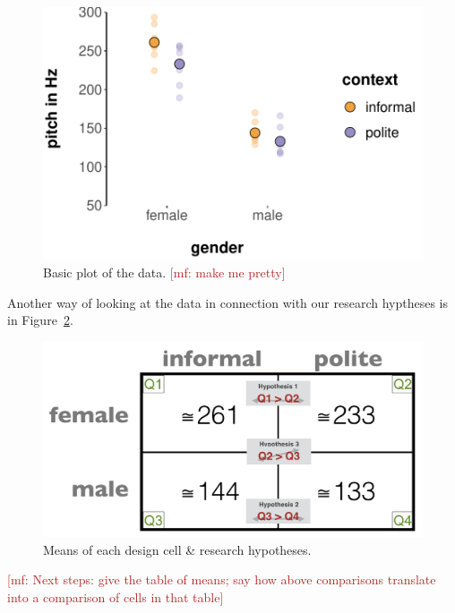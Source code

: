 \documentclass[nobib]{tufte-handout}
\renewcommand{\mf}[1]{\textcolor{firebrick}{[mf: #1]}}
\begin{document}
\begin{figure}[t]
  \centering
    \includegraphics[width = \textwidth]{pics/basic_data_plot.pdf}
    \caption{Basic plot of the data. \mf{make me pretty}}
     \label{fig:BasicPlotData_data}
\end{figure}

Another way of looking at the data in connection with our research hyptheses is in Figure~\ref{fig:BasicPlotData_table}.

\begin{figure}[h]
  \centering
    \includegraphics[width = \textwidth]{pics/table_mean_hypotheses.png}
    \caption{Means of each design cell \& research hypotheses.}
    \label{fig:BasicPlotData_table}
\end{figure}


\mf{Next steps: give the table of means; say how above comparisons translate into a comparison of cells in that table}

\newpage
\end{document}
